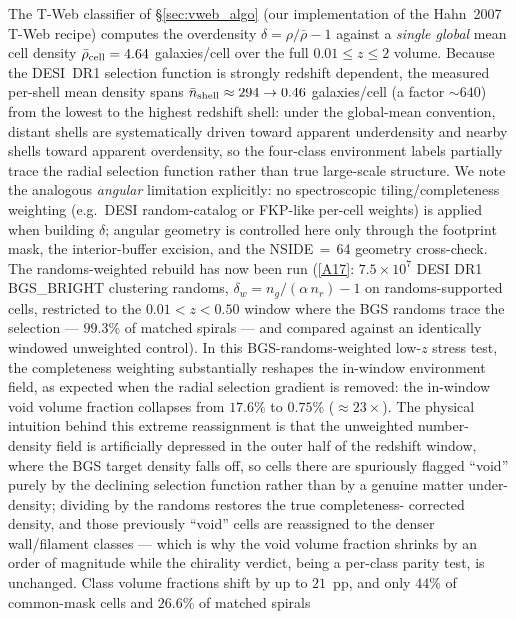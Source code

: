 \documentclass[aps,prd,twocolumn,superscriptaddress,showpacs,preprintnumbers,nofootinbib,longbibliography,floatfix]{revtex4-2}
\newcommand{\repoBase}{https://github.com/Hubify-Projects/bigbounce/blob/main}
\begin{document}
The T-Web classifier of \S\ref{sec:vweb_algo} (our implementation of
the Hahn~2007 T-Web recipe) computes the overdensity
$\delta = \rho/\bar\rho - 1$ against a \emph{single global} mean cell
density $\bar\rho_{\rm cell} = 4.64$ galaxies/cell over the full
$0.01 \le z \le 2$ volume. Because the DESI~DR1 selection function is
strongly redshift dependent, the measured per-shell mean density spans
$\bar n_{\rm shell} \approx 294 \to 0.46$ galaxies/cell (a factor
${\sim}640$) from the lowest to the highest redshift shell: under the
global-mean convention, distant shells are systematically driven toward
apparent underdensity and nearby shells toward apparent overdensity, so
the four-class environment labels partially trace the radial selection
function rather than true large-scale structure. We note the analogous
\emph{angular} limitation explicitly: no spectroscopic
tiling/completeness weighting (e.g.\ DESI random-catalog or FKP-like
per-cell weights) is applied when building $\delta$; angular geometry
is controlled here only through the footprint mask, the interior-buffer
excision, and the NSIDE$\,=\,$64 geometry cross-check. The
randoms-weighted rebuild has now been run
(\href{\repoBase/pipelines/p5\_desi\_chirality/outputs/25\_completeness\_weighted\_rebuild.json}{[A17]}:
$7.5\times 10^7$ DESI DR1 BGS\_BRIGHT clustering randoms,
$\delta_w = n_g/(\alpha\,n_r) - 1$ on randoms-supported cells, restricted
to the $0.01 < z < 0.50$ window where the BGS randoms trace the
selection --- $99.3\%$ of matched spirals --- and compared against an
identically windowed unweighted control). In this BGS-randoms-weighted low-$z$ stress test, the completeness weighting substantially reshapes the in-window environment field, as expected when the radial selection gradient is removed:
the in-window void volume fraction collapses from $17.6\%$ to $0.75\%$
(${\approx}23\times$). The physical intuition behind this extreme
reassignment is that the unweighted number-density field is artificially
depressed in the outer half of the redshift window, where the BGS target
density falls off, so cells there are spuriously flagged ``void'' purely
by the declining selection function rather than by a genuine matter
under-density; dividing by the randoms restores the true completeness-
corrected density, and those previously ``void'' cells are reassigned to
the denser wall/filament classes --- which is why the void volume
fraction shrinks by an order of magnitude while the chirality verdict,
being a per-class parity test, is unchanged. Class volume fractions shift by up to $21$~pp,
and only $44\%$ of common-mask cells and $26.6\%$ of matched spirals
\end{document}
